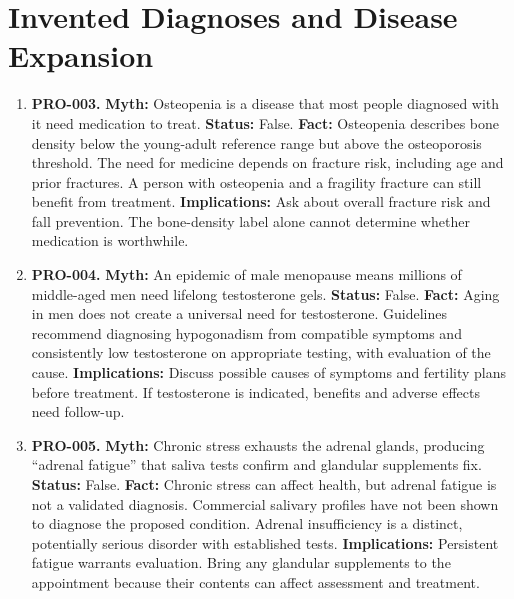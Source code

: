 \documentclass[11pt,oneside]{book}
\begin{document}
\section{Invented Diagnoses and Disease Expansion}
\begin{enumerate}[leftmargin=0pt,labelwidth=0pt,labelsep=0pt,itemindent=0pt]
\item[] \textbf{PRO-003.} \textbf{Myth:} Osteopenia is a disease that most people diagnosed with it need medication to treat.\newline
\textbf{Status:} False.\newline
\textbf{Fact:} Osteopenia describes bone density below the young-adult reference range but above the osteoporosis threshold. The need for medicine depends on fracture risk, including age and prior fractures. A person with osteopenia and a fragility fracture can still benefit from treatment. \cite{ref488}\newline
\textbf{Implications:} Ask about overall fracture risk and fall prevention. The bone-density label alone cannot determine whether medication is worthwhile.
\item[] \textbf{PRO-004.} \textbf{Myth:} An epidemic of male menopause means millions of middle-aged men need lifelong testosterone gels.\newline
\textbf{Status:} False.\newline
\textbf{Fact:} Aging in men does not create a universal need for testosterone. Guidelines recommend diagnosing hypogonadism from compatible symptoms and consistently low testosterone on appropriate testing, with evaluation of the cause. \cite{ref35}\newline
\textbf{Implications:} Discuss possible causes of symptoms and fertility plans before treatment. If testosterone is indicated, benefits and adverse effects need follow-up.
\item[] \textbf{PRO-005.} \textbf{Myth:} Chronic stress exhausts the adrenal glands, producing ``adrenal fatigue'' that saliva tests confirm and glandular supplements fix.\newline
\textbf{Status:} False.\newline
\textbf{Fact:} Chronic stress can affect health, but adrenal fatigue is not a validated diagnosis. Commercial salivary profiles have not been shown to diagnose the proposed condition. Adrenal insufficiency is a distinct, potentially serious disorder with established tests. \cite{ref156,ref489}\newline
\textbf{Implications:} Persistent fatigue warrants evaluation. Bring any glandular supplements to the appointment because their contents can affect assessment and treatment.

\end{enumerate}
\end{document}
